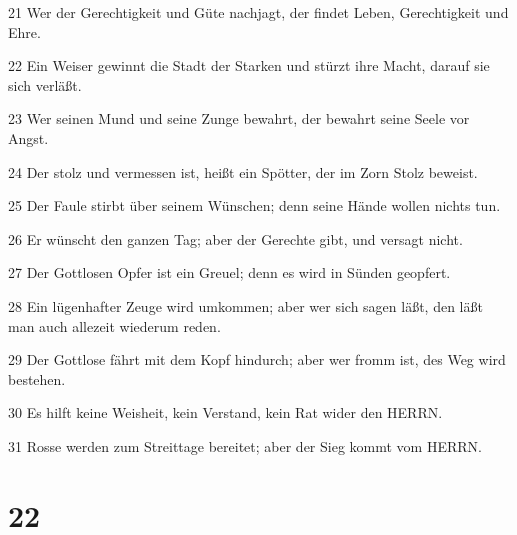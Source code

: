 \par 21 Wer der Gerechtigkeit und Güte nachjagt, der findet Leben, Gerechtigkeit und Ehre.
\par 22 Ein Weiser gewinnt die Stadt der Starken und stürzt ihre Macht, darauf sie sich verläßt.
\par 23 Wer seinen Mund und seine Zunge bewahrt, der bewahrt seine Seele vor Angst.
\par 24 Der stolz und vermessen ist, heißt ein Spötter, der im Zorn Stolz beweist.
\par 25 Der Faule stirbt über seinem Wünschen; denn seine Hände wollen nichts tun.
\par 26 Er wünscht den ganzen Tag; aber der Gerechte gibt, und versagt nicht.
\par 27 Der Gottlosen Opfer ist ein Greuel; denn es wird in Sünden geopfert.
\par 28 Ein lügenhafter Zeuge wird umkommen; aber wer sich sagen läßt, den läßt man auch allezeit wiederum reden.
\par 29 Der Gottlose fährt mit dem Kopf hindurch; aber wer fromm ist, des Weg wird bestehen.
\par 30 Es hilft keine Weisheit, kein Verstand, kein Rat wider den HERRN.
\par 31 Rosse werden zum Streittage bereitet; aber der Sieg kommt vom HERRN.

\chapter{22}

